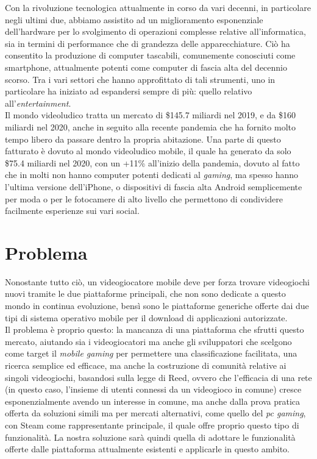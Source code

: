 Con la rivoluzione tecnologica attualmente in corso da vari decenni, in particolare negli ultimi due, abbiamo assistito ad un miglioramento esponenziale dell'hardware per lo svolgimento di operazioni complesse relative all'informatica, sia in termini di performance che di grandezza delle apparecchiature. Ciò ha consentito la produzione di computer tascabili, comunemente conosciuti come smartphone, attualmente potenti come computer di fascia alta del decennio scorso. Tra i vari settori che hanno approfittato di tali strumenti, uno in particolare ha iniziato ad espandersi sempre di più: quello relativo all'\emph{entertainment}.\\
Il mondo videoludico tratta un mercato di \$145.7 miliardi nel 2019, e da \$160 miliardi nel 2020, anche in seguito alla recente pandemia che ha fornito molto tempo libero da passare dentro la propria abitazione. Una parte di questo fatturato è dovuto al mondo videoludico mobile, il quale ha generato da solo \$75.4 miliardi nel 2020, con un +11\% all'inizio della pandemia, dovuto al fatto che in molti non hanno computer potenti dedicati al \emph{gaming}, ma spesso hanno l'ultima versione dell'iPhone, o dispositivi di fascia alta Android semplicemente per moda o per le fotocamere di alto livello che permettono di condividere facilmente esperienze sui vari social.

\section{Problema}
Nonostante tutto ciò, un videogiocatore mobile deve per forza trovare videogiochi nuovi tramite le due piattaforme principali, che non sono dedicate a questo mondo in continua evoluzione, bensì sono le piattaforme generiche offerte dai due tipi di sistema operativo mobile per il download di applicazioni autorizzate. \\
Il problema è proprio questo: la mancanza di una piattaforma che sfrutti questo mercato, aiutando sia i videogiocatori ma anche gli sviluppatori che scelgono come target il \emph{mobile gaming} per permettere una classificazione facilitata, una ricerca semplice ed efficace, ma anche la costruzione di comunità relative ai singoli videogiochi, basandosi sulla legge di Reed, ovvero che l'efficacia di una rete (in questo caso, l'insieme di utenti connessi da un videogioco in comune) cresce esponenzialmente avendo un interesse in comune, ma anche dalla prova pratica offerta da soluzioni simili ma per mercati alternativi, come quello del \emph{pc gaming}, con Steam come rappresentante principale, il quale offre proprio questo tipo di funzionalità.
La nostra soluzione sarà quindi quella di adottare le funzionalità offerte dalle piattaforma attualmente esistenti e applicarle in questo ambito.